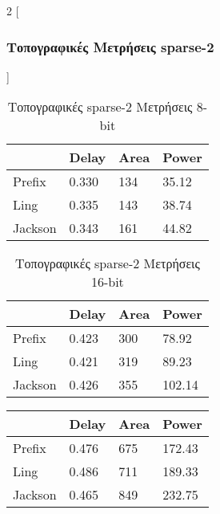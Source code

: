 \begin{multicols}{2}
[\subsubsection{Τοπογραφικές Μετρήσεις sparse-2}]

\begin{table}[H]
\centering
     \begin{tabular}{||p{1.2cm} | p{0.7cm} p{1cm} p{1cm} ||} 
        \hline
         & Delay & Area & Power \\ [0.5ex]
        \hline\hline
        Prefix & 0.330 & 134 & 35.12 \\
        \hline
        Ling & 0.335 & 143 & 38.74 \\
        \hline
        Jackson & 0.343 & 161 & 44.82 \\
        \hline
    \end{tabular}
\caption{Τοπογραφικές sparse-2 Μετρήσεις 8-bit}
\label{topo_sparse2_result_table_8}
\end{table}
\begin{table}[H]
\centering
     \begin{tabular}{||p{1.2cm} | p{0.7cm} p{1cm} p{1cm} ||} 
        \hline
         & Delay & Area & Power \\ [0.5ex] 
        \hline\hline
        Prefix & 0.423 & 300 & 78.92 \\
        \hline
        Ling & 0.421 & 319 & 89.23 \\
        \hline
        Jackson & 0.426 & 355 & 102.14 \\
        \hline
    \end{tabular}
\caption{Τοπογραφικές sparse-2 Μετρήσεις 16-bit}
\label{topo_sparse2_result_table_16}
\end{table}
\begin{table}[H]
\centering
     \begin{tabular}{||p{1.2cm} | p{0.7cm} p{1cm} p{1cm} ||} 
        \hline
         & Delay & Area & Power \\ [0.5ex]
        \hline\hline
        Prefix & 0.476 & 675 & 172.43 \\
        \hline
        Ling & 0.486 & 711 & 189.33 \\
        \hline
        Jackson & 0.465 & 849 & 232.75 \\
        \hline
    \end{tabular}

\end{table}
\end{multicols}
